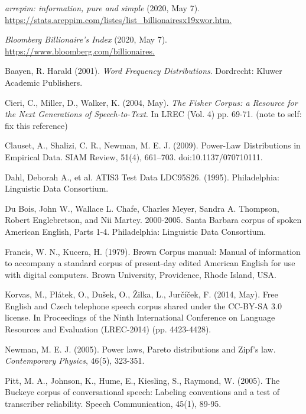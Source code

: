 \documentclass[12pt]{article}
\begin{document}
\begin{thebibliography}{9}

\emph{arrepim: information, pure and simple} (2020, May 7).\\ 
\url{https://stats.areppim.com/listes/list_billionairesx19xwor.htm.}


\emph{Bloomberg Billionaire's Index} (2020, May 7). \\
\url{https://www.bloomberg.com/billionaires.}

Baayen, R. Harald (2001).  \emph{Word Frequency Distributions}. Dordrecht: Kluwer Academic Publishers.

Cieri, C., Miller, D., Walker, K. (2004, May). \emph{The Fisher Corpus: a Resource for the Next Generations of Speech-to-Text}. In LREC (Vol. 4) pp. 69-71. (note to self: fix this reference)

Clauset, A., Shalizi, C. R., Newman, M. E. J. (2009). Power-Law Distributions in Empirical Data. SIAM Review, 51(4), 661–703. doi:10.1137/070710111.


Dahl, Deborah A., et al. ATIS3 Test Data LDC95S26. (1995). Philadelphia: Linguistic Data Consortium.

Du Bois, John W., Wallace L. Chafe, Charles Meyer, Sandra A. Thompson, Robert Englebretson, and Nii Martey. 2000-2005. Santa Barbara corpus of spoken American English, Parts 1-4. Philadelphia: Linguistic Data Consortium.

Francis, W. N., Kucera, H. (1979). Brown Corpus manual: Manual of information to accompany a standard corpus of present-day edited American English for use with digital computers. Brown University, Providence, Rhode Island, USA.

Korvas, M., Plátek, O., Dušek, O., Žilka, L., Jurčíček, F. (2014, May). Free English and Czech telephone speech corpus shared under the CC-BY-SA 3.0 license. In Proceedings of the Ninth International Conference on Language Resources and Evaluation (LREC-2014) (pp. 4423-4428).

Newman, M. E. J. (2005). Power laws, Pareto distributions and Zipf's law.  \emph{Contemporary Physics}, 46(5), 323-351.

Pitt, M. A., Johnson, K., Hume, E., Kiesling, S., Raymond, W. (2005). The Buckeye corpus of conversational speech: Labeling conventions and a test of transcriber reliability. Speech Communication, 45(1), 89-95.


\end{thebibliography}
\end{document}
